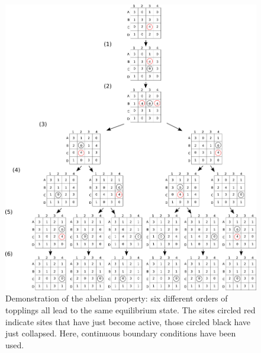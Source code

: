 \begin{figure}[!htpb]
\centering
\includegraphics[width=\textwidth]{pics/pic1_abelian.pdf}
\caption[]{Demonstration of the abelian property: six different orders of topplings all lead to the same equilibrium state. The sites circled red indicate sites that have just become active, those circled black have just collapsed. Here, continuous boundary conditions have been used.}
\label{pics:abelian}
\end{figure}

